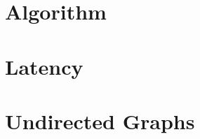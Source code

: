 \documentclass[runningheads]{llncs}
\begin{document}

\section{Algorithm}




\section{Latency}


\section{Undirected Graphs}




\end{document}
